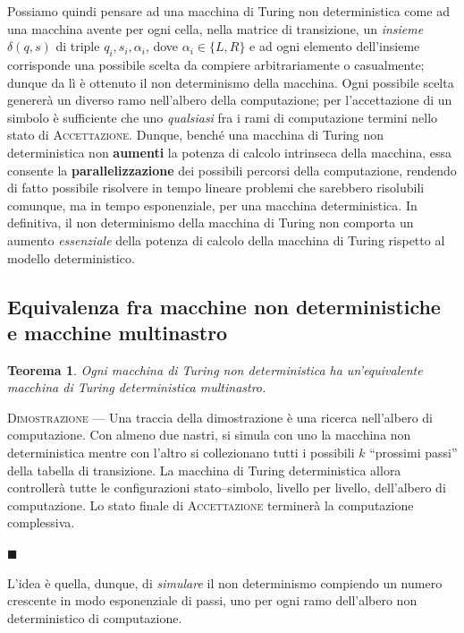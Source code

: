 \documentclass[10pt]{\classname}
\newtheorem{thm}{Teorema}
\theoremstyle{definition}
\theoremstyle{definition}
\theoremstyle{definition}
\theoremstyle{definition}
\begin{document}
Possiamo quindi pensare ad una macchina di Turing non deterministica
come ad una macchina avente per ogni cella, nella matrice di transizione, un
\emph{insieme} $\delta(q,s)$ di triple $q_i, s_i, \alpha_i$, dove $\alpha_i \in
\{L,R\}$ e ad ogni elemento dell'insieme corrisponde una possibile scelta da
compiere arbitrariamente o casualmente; dunque da lì è ottenuto il non
determinismo della macchina. Ogni possibile scelta genererà un diverso ramo
nell'albero della computazione; per l'accettazione di un simbolo è
sufficiente che uno \emph{qualsiasi} fra i rami di computazione termini nello
stato di \textsc{Accettazione}. Dunque, benché una macchina di Turing non
deterministica non \textbf{aumenti} la potenza di calcolo intrinseca della
macchina, essa consente la \textbf{parallelizzazione} dei possibili percorsi
della computazione, rendendo di fatto possibile risolvere in tempo lineare
problemi che sarebbero risolubili comunque, ma in tempo esponenziale, per una
macchina deterministica. In definitiva, il non determinismo della macchina di Turing non comporta un aumento \emph{essenziale} della potenza di calcolo della macchina di Turing rispetto al modello deterministico.

\subsection{Equivalenza fra macchine non deterministiche e macchine multinastro}

\begin{thm}
    Ogni macchina di Turing non deterministica ha un'equivalente macchina di
    Turing deterministica multinastro.
\end{thm}

\textsc{Dimostrazione} --- Una traccia della dimostrazione è una ricerca
nell'albero di computazione. Con almeno due nastri, si simula con uno la
macchina non deterministica mentre con l'altro si collezionano tutti i
possibili $k$ ``prossimi passi'' della tabella di transizione. La macchina di
Turing deterministica allora controllerà tutte le configurazioni
stato--simbolo, livello per livello, dell'albero di computazione. Lo stato
finale di \textsc{Accettazione } terminerà la computazione complessiva.

\begin{flushright}
$\blacksquare$
\end{flushright}

L'idea è quella, dunque, di \emph{simulare} il non determinismo compiendo un
numero crescente in modo esponenziale di passi, uno per ogni ramo dell'albero
non deterministico di computazione.
\end{document}
